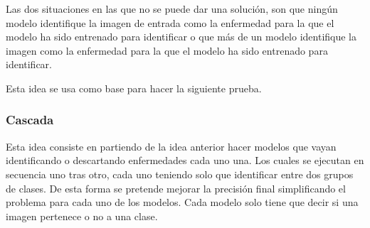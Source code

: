 \documentclass[12pt,a4paper]{article}
\begin{document}
Las dos situaciones en las que no se puede dar una solución, son que ningún modelo identifique la imagen de entrada como la enfermedad para la que el modelo ha sido entrenado para identificar o que más de un modelo identifique la imagen como la enfermedad para la que  el modelo ha sido entrenado para identificar.
\bigskip

Esta idea se usa como base para hacer la siguiente prueba.


\subsubsection{Cascada}
Esta idea consiste en partiendo de la idea anterior hacer modelos que vayan identificando o descartando enfermedades cada uno una. Los cuales se ejecutan en secuencia uno tras otro, cada uno teniendo solo que identificar entre dos grupos de clases. De esta forma se pretende mejorar la precisión final simplificando el problema para cada uno de los modelos. Cada modelo solo tiene que decir si una imagen pertenece o no a una clase.
\end{document}
